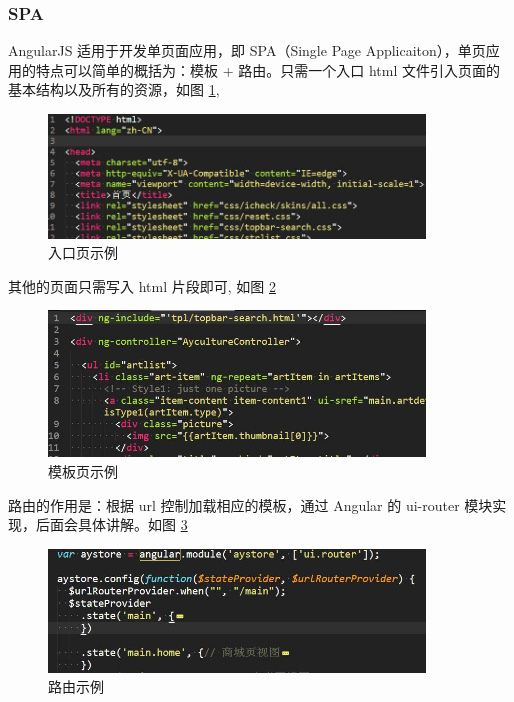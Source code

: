             \subsubsection{SPA}
              \label{subsubsec:spa}
                AngularJS 适用于开发单页面应用，即 SPA（Single Page Applicaiton），单页应用的特点可以简单的概括为：模板 + 路由。只需一个入口 html 文件引入页面的基本结构以及所有的资源，如图 \ref{fig:index},
                \begin{figure}[H]
                  \centering
                  \includegraphics[width=10cm]{./img/index.jpg}
                  \caption{入口页示例}
                  \label{fig:index}
                \end{figure}

                其他的页面只需写入 html 片段即可, 如图 \ref{fig:tpl}

                \begin{figure}[H]
                  \centering
                  \includegraphics[width=10cm]{./img/tpl.jpg}
                  \caption{模板页示例}
                  \label{fig:tpl}
                \end{figure}

                路由的作用是：根据 url 控制加载相应的模板，通过 Angular 的 ui-router 模块实现，后面会具体讲解。如图 \ref{fig:router}

                \begin{figure}[H]
                  \centering
                  \includegraphics[width=10cm]{./img/router.jpg}
                  \caption{路由示例}
                  \label{fig:router}
                \end{figure}

